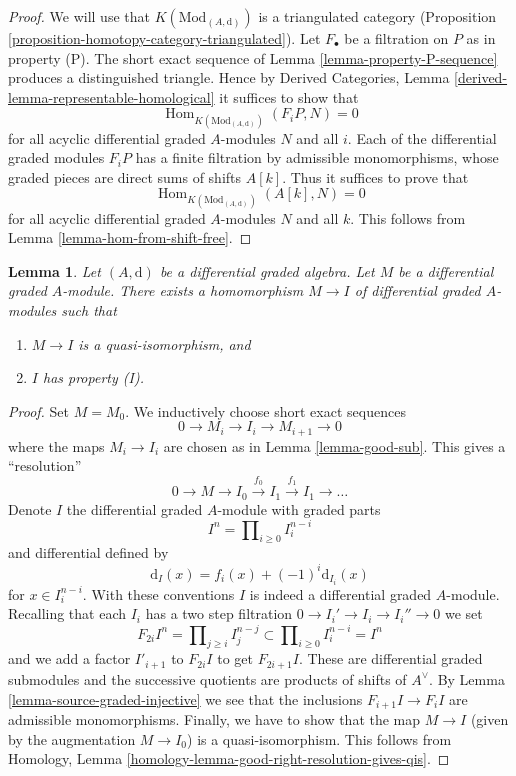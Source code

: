 \documentclass{stacks-project}
\theoremstyle{plain}
\newtheorem{lemma}[subsection]{Lemma}
\theoremstyle{definition}
\theoremstyle{remark}
\numberwithin{equation}{subsection}
\def\Hom{\mathop{\mathrm{Hom}}\nolimits}
\begin{document}
\begin{proof}
We will use that $K(\text{Mod}_{(A, \text{d})})$ is a triangulated
category (Proposition \ref{proposition-homotopy-category-triangulated}).
Let $F_\bullet$ be a filtration on $P$ as in property (P).
The short exact sequence of Lemma \ref{lemma-property-P-sequence}
produces a distinguished triangle. Hence by
Derived Categories, Lemma \ref{derived-lemma-representable-homological}
it suffices to show that
$$
\Hom_{K(\text{Mod}_{(A, \text{d})})}(F_iP, N) = 0
$$
for all acyclic differential graded $A$-modules $N$ and all $i$.
Each of the differential graded modules $F_iP$ has a finite filtration
by admissible monomorphisms, whose graded pieces are direct sums
of shifts $A[k]$. Thus it suffices to prove that
$$
\Hom_{K(\text{Mod}_{(A, \text{d})})}(A[k], N) = 0
$$
for all acyclic differential graded $A$-modules $N$ and all $k$.
This follows from Lemma \ref{lemma-hom-from-shift-free}.
\end{proof}

\begin{lemma}
\label{lemma-right-resolution}
Let $(A, \text{d})$ be a differential graded algebra.
Let $M$ be a differential graded $A$-module. There exists a homomorphism
$M \to I$ of differential graded $A$-modules such that
\begin{enumerate}
\item $M \to I$ is a quasi-isomorphism, and
\item $I$ has property (I).
\end{enumerate}
\end{lemma}

\begin{proof}
Set $M = M_0$. We inductively choose short exact sequences
$$
0 \to M_i \to I_i \to M_{i + 1} \to 0
$$
where the maps $M_i \to I_i$ are chosen as in Lemma \ref{lemma-good-sub}.
This gives a ``resolution''
$$
0 \to M \to I_0 \xrightarrow{f_0} I_1 \xrightarrow{f_1} I_1 \to \ldots
$$
Denote $I$ the differential graded $A$-module with graded parts
$$
I^n = \prod\nolimits_{i \geq 0} I^{n - i}_i
$$
and differential defined by
$$
\text{d}_I(x) = f_i(x) + (-1)^i \text{d}_{I_i}(x)
$$
for $x \in I_i^{n - i}$. With these conventions $I$ is indeed a differential
graded $A$-module. Recalling that each $I_i$ has a two step filtration
$0 \to I_i' \to I_i \to I_i'' \to 0$ we set
$$
F_{2i}I^n = \prod\nolimits_{j \geq i} I^{n - j}_j
\subset
\prod\nolimits_{i \geq 0} I^{n - i}_i = I^n
$$
and we add a factor $I'_{i + 1}$ to $F_{2i}I$ to get $F_{2i + 1}I$.
These are differential graded submodules and the successive quotients
are products of shifts of $A^\vee$. By
Lemma \ref{lemma-source-graded-injective} we see that
the inclusions $F_{i + 1}I \to F_iI$ are admissible monomorphisms.
Finally, we have to show that the map $M \to I$ (given by the
augmentation $M \to I_0$) is a quasi-isomorphism. This follows from
Homology, Lemma \ref{homology-lemma-good-right-resolution-gives-qis}.
\end{proof}
\end{document}
